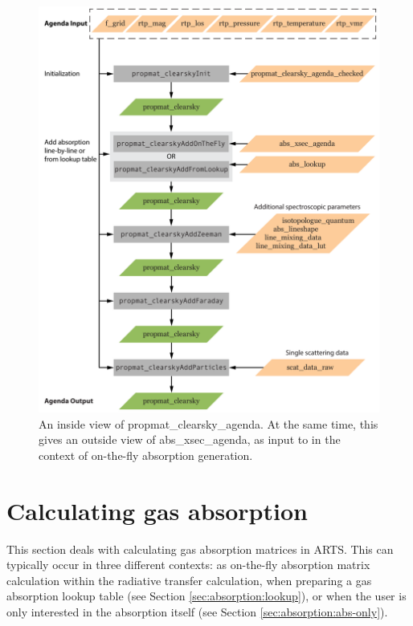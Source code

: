 \begin{figure}
 \begin{center}
  \includegraphics[scale=0.7]{propmat_clearsky_agenda_detail}
  \caption{An inside view of propmat\_clearsky\_agenda. At the same
    time, this gives an outside view of abs\_xsec\_agenda, as input to
     in the context of
    on-the-fly absorption generation.}
  \label{fig:absorption:pmat_inside}
 \end{center}
\end{figure}



\section{Calculating gas absorption}
\label{sec:absorption:calculating}

This section deals with calculating gas absorption matrices in
ARTS.  This can typically occur in three different contexts:
as on-the-fly absorption matrix calculation within the radiative transfer
calculation,
when preparing
a gas absorption lookup table (see Section \ref{sec:absorption:lookup}),
or when the user is only interested in the absorption itself (see Section
\ref{sec:absorption:abs-only}).

